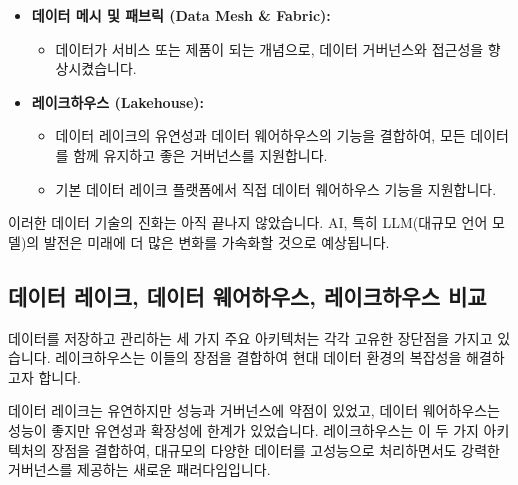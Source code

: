 \documentclass[11pt,a4paper]{article}
\theoremstyle{definition}
\begin{document}
\begin{itemize}
\begin{itemize}
        \item 그러나 적절한 거버넌스 없이는 쉽게 데이터 스웜프(Data Swamp)로 변질될 수 있었습니다.
    \end{itemize}
    \item \textbf{데이터 메시 및 패브릭 (Data Mesh & Fabric):}
    \begin{itemize}
        \item 데이터가 서비스 또는 제품이 되는 개념으로, 데이터 거버넌스와 접근성을 향상시켰습니다.
    \end{itemize}
    \item \textbf{레이크하우스 (Lakehouse):}
    \begin{itemize}
        \item 데이터 레이크의 유연성과 데이터 웨어하우스의 기능을 결합하여, 모든 데이터를 함께 유지하고 좋은 거버넌스를 지원합니다.
        \item 기본 데이터 레이크 플랫폼에서 직접 데이터 웨어하우스 기능을 지원합니다.
    \end{itemize}
\end{itemize}

\begin{warningbox}[title=지속적인 진화]
이러한 데이터 기술의 진화는 아직 끝나지 않았습니다. AI, 특히 LLM(대규모 언어 모델)의 발전은 미래에 더 많은 변화를 가속화할 것으로 예상됩니다.
\end{warningbox}

\subsection{데이터 레이크, 데이터 웨어하우스, 레이크하우스 비교}
데이터를 저장하고 관리하는 세 가지 주요 아키텍처는 각각 고유한 장단점을 가지고 있습니다. 레이크하우스는 이들의 장점을 결합하여 현대 데이터 환경의 복잡성을 해결하고자 합니다.

\begin{summarybox}[title=핵심 요약: 레이크하우스의 등장 배경]
데이터 레이크는 유연하지만 성능과 거버넌스에 약점이 있었고, 데이터 웨어하우스는 성능이 좋지만 유연성과 확장성에 한계가 있었습니다. 레이크하우스는 이 두 가지 아키텍처의 장점을 결합하여, 대규모의 다양한 데이터를 고성능으로 처리하면서도 강력한 거버넌스를 제공하는 새로운 패러다임입니다.
\end{summarybox}
\end{document}
